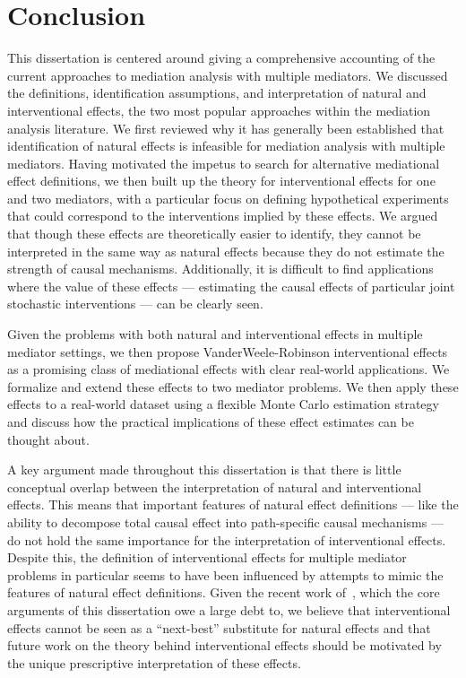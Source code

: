 \chapter{Conclusion}\label{chapter:conclusion}

This dissertation is centered around giving a comprehensive accounting of the 
current approaches to mediation analysis with multiple mediators. We 
discussed the definitions, identification assumptions, and interpretation of natural and 
interventional effects, the two most popular approaches within the mediation analysis 
literature. We first reviewed why it has generally been established that identification
of natural effects is infeasible for mediation analysis with multiple mediators. Having 
motivated the impetus to search for alternative mediational effect definitions, we then 
built up the theory for interventional effects for one and two mediators, with a 
particular focus on defining hypothetical experiments that could correspond to the 
interventions implied by these effects. We argued that though these effects are 
theoretically easier to identify, they cannot be interpreted in the same way as 
natural effects because they do not estimate the strength of causal mechanisms. 
Additionally, it is difficult to find applications where the value of these 
effects --- estimating the causal effects of particular joint stochastic 
interventions --- can be clearly seen. 

Given the problems with both natural and interventional effects in multiple mediator 
settings, we then propose VanderWeele-Robinson interventional effects as a 
promising class of mediational effects with clear real-world applications. We 
formalize and extend these effects to two mediator problems. We then apply 
these effects to a real-world dataset using a flexible Monte Carlo estimation 
strategy and discuss how the practical implications of these effect estimates can 
be thought about. 

A key argument made throughout this dissertation is that there is little conceptual 
overlap between the interpretation of natural and interventional effects. This means 
that important features of natural effect definitions --- like the ability to decompose
total causal effect into path-specific causal mechanisms --- do not hold the same 
importance for the interpretation of interventional effects. Despite this, the 
definition of interventional effects for multiple mediator problems in particular 
seems to have been influenced by attempts to mimic the features of natural effect 
definitions. Given the recent work of~\cite{miles2023}, which the core arguments of 
this dissertation owe a large debt to, we believe that interventional
effects cannot be seen as a ``next-best'' substitute for natural effects and that 
future work on the theory behind interventional effects should be motivated by 
the unique prescriptive interpretation of these effects.

